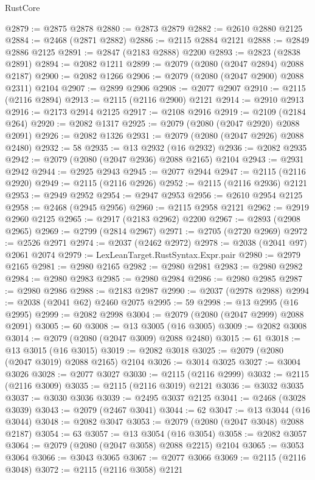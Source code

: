 \begin{lexlean}{RustCore}
\begin{coremodule}
@2879 := @2875 @2878
@2880 := @2873 @2879
@2882 := @2610 @2880 @2125
@2884 := @2468 (@2871 @2882)
@2886 := @2115 @2884 @2121
@2888 := @2849 @2886 @2125
@2891 := @2847 (@2183 @2888) @2200
@2893 := @2823 (@2838 @2891)
@2894 := @2082 @1211
@2899 := @2079 (@2080 (@2047 @2894) @2088 @2187)
@2900 := @2082 @1266
@2906 := @2079 (@2080 (@2047 @2900) @2088 @2311) @2104
@2907 := @2899 @2906
@2908 := @2077 @2907
@2910 := @2115 (@2116 @2894)
@2913 := @2115 (@2116 @2900) @2121
@2914 := @2910 @2913
@2916 := @2173 @2914 @2125
@2917 := @2108 @2916
@2919 := @2109 (@2184 @264)
@2920 := @2082 @1317
@2925 := @2079 (@2080 (@2047 @2920) @2088 @2091)
@2926 := @2082 @1326
@2931 := @2079 (@2080 (@2047 @2926) @2088 @2480)
@2932 := 58
@2935 := @13 @2932 (@16 @2932)
@2936 := @2082 @2935
@2942 := @2079 (@2080 (@2047 @2936) @2088 @2165) @2104
@2943 := @2931 @2942
@2944 := @2925 @2943
@2945 := @2077 @2944
@2947 := @2115 (@2116 @2920)
@2949 := @2115 (@2116 @2926)
@2952 := @2115 (@2116 @2936) @2121
@2953 := @2949 @2952
@2954 := @2947 @2953
@2956 := @2610 @2954 @2125
@2958 := @2468 (@2945 @2956)
@2960 := @2115 @2958 @2121
@2962 := @2919 @2960 @2125
@2965 := @2917 (@2183 @2962) @2200
@2967 := @2893 (@2908 @2965)
@2969 := @2799 (@2814 @2967)
@2971 := @2705 (@2720 @2969)
@2972 := @2526 @2971
@2974 := @2037 (@2462 @2972)
@2978 := @2038 (@2041 @97) @2061 @2074
@2979 := LexLeanTarget.RustSyntax.Expr.pair
@2980 := @2979 @2165
@2981 := @2980 @2165
@2982 := @2980 @2981
@2983 := @2980 @2982
@2984 := @2980 @2983
@2985 := @2980 @2984
@2986 := @2980 @2985
@2987 := @2980 @2986
@2988 := @2183 @2987
@2990 := @2037 (@2978 @2988)
@2994 := @2038 (@2041 @62) @2460 @2075
@2995 := 59
@2998 := @13 @2995 (@16 @2995)
@2999 := @2082 @2998
@3004 := @2079 (@2080 (@2047 @2999) @2088 @2091)
@3005 := 60
@3008 := @13 @3005 (@16 @3005)
@3009 := @2082 @3008
@3014 := @2079 (@2080 (@2047 @3009) @2088 @2480)
@3015 := 61
@3018 := @13 @3015 (@16 @3015)
@3019 := @2082 @3018
@3025 := @2079 (@2080 (@2047 @3019) @2088 @2165) @2104
@3026 := @3014 @3025
@3027 := @3004 @3026
@3028 := @2077 @3027
@3030 := @2115 (@2116 @2999)
@3032 := @2115 (@2116 @3009)
@3035 := @2115 (@2116 @3019) @2121
@3036 := @3032 @3035
@3037 := @3030 @3036
@3039 := @2495 @3037 @2125
@3041 := @2468 (@3028 @3039)
@3043 := @2079 (@2467 @3041)
@3044 := 62
@3047 := @13 @3044 (@16 @3044)
@3048 := @2082 @3047
@3053 := @2079 (@2080 (@2047 @3048) @2088 @2187)
@3054 := 63
@3057 := @13 @3054 (@16 @3054)
@3058 := @2082 @3057
@3064 := @2079 (@2080 (@2047 @3058) @2088 @2215) @2104
@3065 := @3053 @3064
@3066 := @3043 @3065
@3067 := @2077 @3066
@3069 := @2115 (@2116 @3048)
@3072 := @2115 (@2116 @3058) @2121

\end{coremodule}
\end{lexlean}
